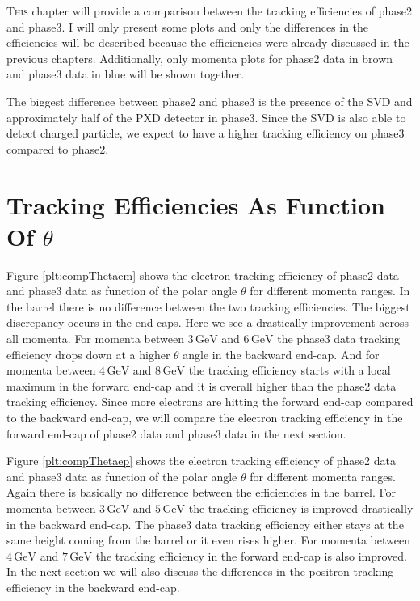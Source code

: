 \documentclass[a4paper,11pt,twosided,final,german,openbib,pdftex,listof=totoc,bibliography=totoc]{scrbook}
\begin{document}
\lettrine{T}{his} chapter will provide a comparison between the tracking efficiencies of phase2 and phase3. I will only present some plots and only the differences in the efficiencies will be described because the efficiencies were already discussed in the previous chapters. Additionally, only momenta plots for phase2 data in brown and phase3 data in blue will be shown together.
\newline

The biggest difference between phase2 and phase3 is the presence of the SVD and approximately half of the PXD detector in phase3.
Since the SVD is also able to detect charged particle, we expect to have a higher tracking efficiency on phase3 compared to phase2.

\section{Tracking Efficiencies As Function Of $\theta$}


Figure \ref{plt:compThetaem} shows the electron tracking efficiency of phase2 data and phase3 data as function of the polar angle $\theta$ for different momenta ranges. In the barrel there is no difference between the two tracking efficiencies. The biggest discrepancy occurs in the end-caps. Here we see a drastically improvement across all momenta. 
For momenta between $3\,\textrm{GeV}$ and $6\,\textrm{GeV}$ the phase3 data tracking efficiency drops down at a higher $\theta$ angle in the backward end-cap. 
And for momenta between $4\,\textrm{GeV}$ and $8\,\textrm{GeV}$ the tracking efficiency starts with a local maximum in the forward end-cap and it is overall higher than the phase2 data tracking efficiency. Since more electrons are hitting the forward end-cap compared to the backward end-cap, we will compare the electron tracking efficiency in the forward end-cap of phase2 data and phase3 data in the next section. 


Figure \ref{plt:compThetaep} shows the electron tracking efficiency of phase2 data and phase3 data as function of the polar angle $\theta$ for different momenta ranges. Again there is basically no difference between the efficiencies in the barrel. 
For momenta between $3\,\textrm{GeV}$ and $5\,\textrm{GeV}$ the tracking efficiency is improved drastically in the backward end-cap. The phase3 data tracking efficiency either stays at the same height coming from the barrel or it even rises higher. 
For momenta between $4\,\textrm{GeV}$ and $7\,\textrm{GeV}$ the tracking efficiency in the forward end-cap is also improved. In the next section we will also discuss the differences in the positron tracking efficiency in the backward end-cap.
\end{document}

